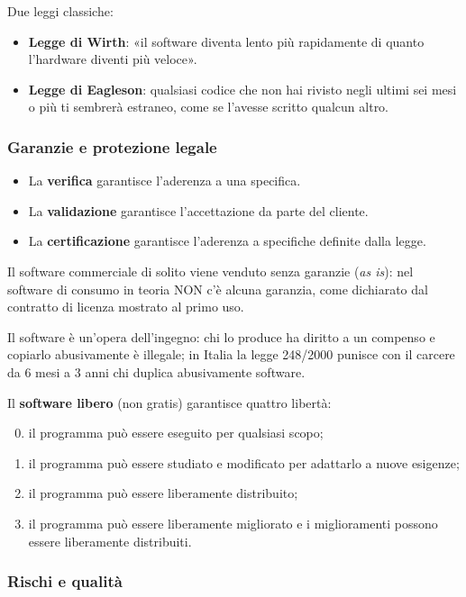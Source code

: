 \documentclass[a4paper,12pt]{article}
\begin{document}
Due leggi classiche:
\begin{itemize}
  \item \textbf{Legge di Wirth}: «il software diventa lento più rapidamente di quanto
        l'hardware diventi più veloce».
  \item \textbf{Legge di Eagleson}: qualsiasi codice che non hai rivisto negli ultimi
        sei mesi o più ti sembrerà estraneo, come se l'avesse scritto qualcun altro.
\end{itemize}

\subsubsection{Garanzie e protezione legale}

\begin{itemize}
  \item La \textbf{verifica} garantisce l'aderenza a una specifica.
  \item La \textbf{validazione} garantisce l'accettazione da parte del cliente.
  \item La \textbf{certificazione} garantisce l'aderenza a specifiche definite dalla legge.
\end{itemize}
Il software commerciale di solito viene venduto senza garanzie (\emph{as is}): nel
software di consumo in teoria NON c'è alcuna garanzia, come dichiarato dal contratto di
licenza mostrato al primo uso.

Il software è un'opera dell'ingegno: chi lo produce ha diritto a un compenso e copiarlo
abusivamente è illegale; in Italia la legge 248/2000 punisce con il carcere da 6 mesi a
3 anni chi duplica abusivamente software.

Il \textbf{software libero} (non gratis) garantisce quattro libertà:
\begin{enumerate}
  \setcounter{enumi}{-1}
  \item il programma può essere eseguito per qualsiasi scopo;
  \item il programma può essere studiato e modificato per adattarlo a nuove esigenze;
  \item il programma può essere liberamente distribuito;
  \item il programma può essere liberamente migliorato e i miglioramenti possono essere
        liberamente distribuiti.
\end{enumerate}

\subsubsection{Rischi e qualità}
\end{document}
